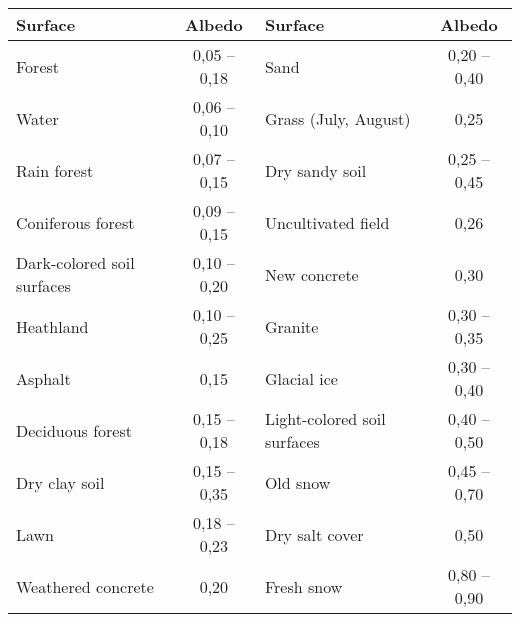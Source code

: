 \footnotesize
\begin{tabular}{|l|c|l|c|}
	\hline
	\textbf{Surface} & \textbf{Albedo} & \textbf{Surface} & \textbf{Albedo} \\
	\hline
	Forest & 0,05 -- 0,18 & Sand & 0,20 -- 0,40 \\
	Water & 0,06 -- 0,10 & Grass (July, August) & 0,25 \\
	Rain forest & 0,07 -- 0,15 & Dry sandy soil & 0,25 -- 0,45 \\
	Coniferous forest & 0,09 -- 0,15 & Uncultivated field & 0,26 \\
	Dark-colored soil surfaces & 0,10 -- 0,20 & New concrete & 0,30 \\
	Heathland & 0,10 -- 0,25 & Granite & 0,30 -- 0,35 \\
	Asphalt & 0,15 & Glacial ice & 0,30 -- 0,40 \\
	Deciduous forest & 0,15 -- 0,18 & Light-colored soil surfaces & 0,40 -- 0,50 \\
	Dry clay soil & 0,15 -- 0,35 & Old snow & 0,45 -- 0,70 \\
	Lawn & 0,18 -- 0,23 & Dry salt cover & 0,50 \\
	Weathered concrete & 0,20 & Fresh snow & 0,80 -- 0,90 \\
	\hline
\end{tabular}